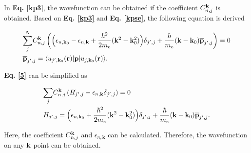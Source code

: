 \documentclass[a4paper, 12pt, titlepage,oneside,drop]{kthesis}
\begin{document}
In \textbf{Eq. \ref{kp3}}, the wavefunction can be obtained if the coefficient $C_{n,j}^{\bold k}$ is obtained. Based on \textbf{Eq. \ref{kp3}} and  \textbf{Eq. \ref{kpse}}, the following equation is derived

\begin{equation}\begin{split}\label{5}
& {\sum\limits_{j}^{N}}  C_{n,j}^{\bold k} \left(  \Big(  \epsilon_{n,\textbf{k}_0} -  \epsilon_{n,\textbf{k}}  + \frac{{\hbar}^2}{2m_e} { (\bold {k}^2- \bold {k}_0^2)}    \Big) \delta_{j',j} + \frac{\hbar}{m_e} {(\bold {k}-\bold{k}_0)} {\overline{\textbf{p}}_{j',j}} \right ) = 0 \\
& {\overline{\textbf{p}}_{j',j}} = \langle \ubloch<j'><\textbf{k}_0>| {\textbf p} | \ubloch<j><\textbf{k}_0>  \rangle.
\end{split}
\end{equation}

\textbf{Eq. \ref{5}} can be simplified as
 
\begin{equation}\begin{split}\label{6}
& {\sum\limits_{j}} C_{n,j}^{\bold {k}} \left ( H_{j',j}-  \epsilon_{n,\textbf{k}} \delta_{j',j} \right ) =0 \\
& H_{j',j} = \Big(   \epsilon_{n,\textbf{k}_0}  + \frac{{\hbar}^2}{2m_e} { (\bold{k}^2-\bold{k}_0^2)}    \Big) \delta_{j',j} + \frac{\hbar}{m_e} {(\bold{k}-\bold{k}_0)} {\overline{\textbf{p}}_{j',j}}.
\end{split}
\end{equation}

Here, the coefficient $ C_{n,j}^{\bold k}$ and $\epsilon_{n,\textbf{k}}$ can be calculated. Therefore, the wavefunction on any ${ \textbf k}$ point can be obtained.
\end{document}
